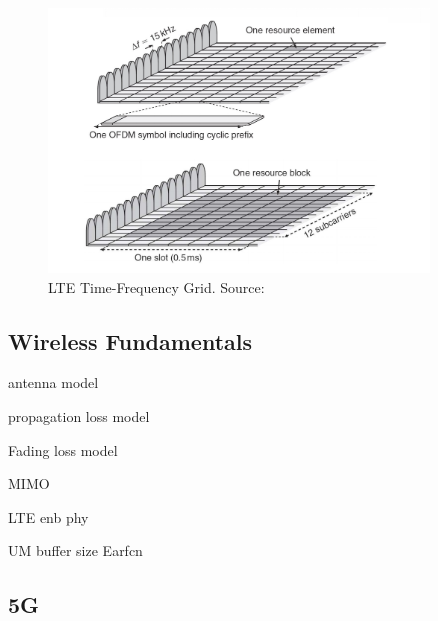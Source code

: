 \begin{figure}[h]
  \centering
  \includegraphics[width=0.9\textwidth]{img/lte_rb.png}
  \caption{LTE Time-Frequency Grid. Source:\cite{cmov1} }
  \label{fig:lterb}
\end{figure}

\subsection{Wireless Fundamentals}

antenna model

propagation loss model

Fading loss model

MIMO

LTE enb phy

UM buffer size
Earfcn

\subsection{5G}
\label{sec:5G}


